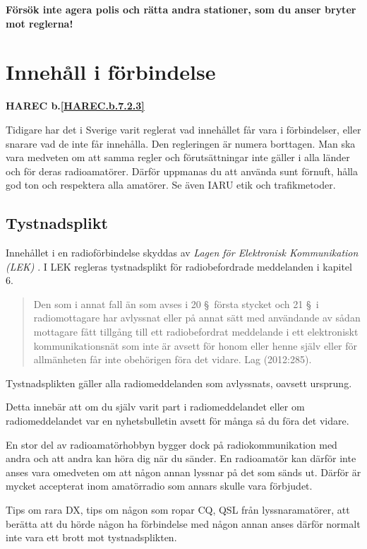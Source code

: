 \textbf{Försök inte agera polis och rätta andra stationer, som du anser bryter mot reglerna!}

\section{Innehåll i förbindelse}
\textbf{HAREC
	b.\ref{HAREC.b.7.2.3}\label{myHAREC.b.7.2.3}
}

Tidigare har det i Sverige varit reglerat vad innehållet får vara i
förbindelser, eller snarare vad de inte får innehålla.
Den regleringen är numera borttagen.
Man ska vara medveten om att samma regler och förutsättningar inte gäller i
alla länder och för deras radioamatörer.
Därför uppmanas du att använda sunt förnuft, hålla god ton och respektera alla
amatörer.
Se även IARU etik och trafikmetoder.

\subsection{Tystnadsplikt}

Innehållet i en radioförbindelse skyddas av
\emph{Lagen för Elektronisk Kommunikation (LEK)} \cite{SFS2003:389}.
I LEK regleras tystnadsplikt för radiobefordrade meddelanden i kapitel 6.

\begin{quote}
	Den som i annat fall än som avses i 20 \S~första stycket och 21 \S~i
	radiomottagare har avlyssnat eller på annat sätt med användande av sådan
	mottagare fått tillgång till ett radiobefordrat meddelande i ett
	elektroniskt kommunikationsnät som inte är avsett för honom eller henne
	själv eller för allmänheten får inte obehörigen föra det vidare.
	Lag (2012:285).\cite[kap 6, \S23]{SFS2003:389}
\end{quote}

Tystnadsplikten gäller alla radiomeddelanden som avlyssnats, oavsett ursprung.

Detta innebär att om du själv varit part i radiomeddelandet eller om 
radiomeddelandet var en nyhetsbulletin avsett för många så du föra det vidare.

En stor del av radioamatörhobbyn bygger dock på radiokommunikation med andra och
att andra kan höra dig när du sänder.
En radioamatör kan därför inte anses vara omedveten om att någon annan lyssnar
på det som sänds ut.
Därför är mycket accepterat inom amatörradio som annars skulle vara förbjudet.

Tips om rara DX, tips om någon som ropar CQ, QSL från lyssnaramatörer, att
berätta att du hörde någon ha förbindelse med någon annan anses därför normalt
inte vara ett brott mot tystnadsplikten.

